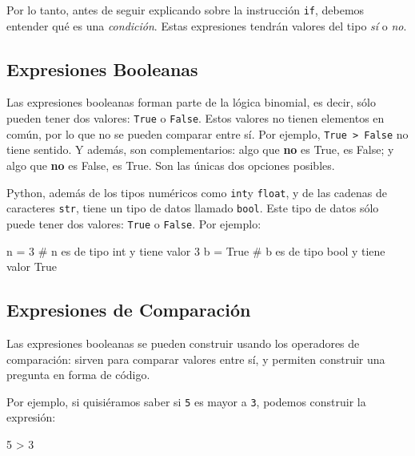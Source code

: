 \documentclass[
  letterpaper,
  DIV=11,
  numbers=noendperiod]{scrreprt}
\newenvironment{Shaded}{\begin{snugshade}}{\end{snugshade}}
\newcommand{\CommentTok}[1]{\textcolor[rgb]{0.37,0.37,0.37}{#1}}
\newcommand{\DecValTok}[1]{\textcolor[rgb]{0.68,0.00,0.00}{#1}}
\newcommand{\NormalTok}[1]{\textcolor[rgb]{0.00,0.23,0.31}{#1}}
\newcommand{\OperatorTok}[1]{\textcolor[rgb]{0.37,0.37,0.37}{#1}}
\newcommand{\VariableTok}[1]{\textcolor[rgb]{0.07,0.07,0.07}{#1}}
\begin{document}
Por lo tanto, antes de seguir explicando sobre la instrucción
\texttt{if}, debemos entender qué es una \emph{condición}. Estas
expresiones tendrán valores del tipo \emph{sí} o \emph{no}.

\subsection{Expresiones Booleanas}\label{expresiones-booleanas}

Las expresiones booleanas forman parte de la lógica binomial, es decir,
sólo pueden tener dos valores: \texttt{True} o \texttt{False}. Estos
valores no tienen elementos en común, por lo que no se pueden comparar
entre sí. Por ejemplo, \texttt{True\ \textgreater{}\ False} no tiene
sentido. Y además, son complementarios: algo que \textbf{no} es True, es
False; y algo que \textbf{no} es False, es True. Son las únicas dos
opciones posibles.

Python, además de los tipos numéricos como \texttt{int}y \texttt{float},
y de las cadenas de caracteres \texttt{str}, tiene un tipo de datos
llamado \texttt{bool}. Este tipo de datos sólo puede tener dos valores:
\texttt{True} o \texttt{False}. Por ejemplo:

\begin{Shaded}
\begin{Highlighting}[]
\NormalTok{n }\OperatorTok{=} \DecValTok{3} \CommentTok{\# n es de tipo \textquotesingle{}int\textquotesingle{} y tiene valor 3}
\NormalTok{b }\OperatorTok{=} \VariableTok{True} \CommentTok{\# b es de tipo \textquotesingle{}bool\textquotesingle{} y tiene valor True}
\end{Highlighting}
\end{Shaded}

\subsection{Expresiones de
Comparación}\label{expresiones-de-comparaciuxf3n}

Las expresiones booleanas se pueden construir usando los operadores de
comparación: sirven para comparar valores entre sí, y permiten construir
una pregunta en forma de código.

Por ejemplo, si quisiéramos saber si \texttt{5} es mayor a \texttt{3},
podemos construir la expresión:

\begin{Shaded}
\begin{Highlighting}[]
\DecValTok{5} \OperatorTok{\textgreater{}} \DecValTok{3}
\end{Highlighting}
\end{Shaded}
\end{document}
